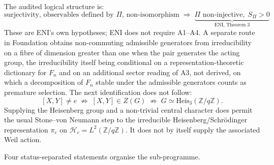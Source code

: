 \documentclass[11pt,a4paper]{article}
\theoremstyle{definition}
\newcommand{\Heis}{\mathrm{Heis}}
\newcommand{\SPI}{S_\Pi}
\newcommand{\Hc}{\mathcal{H}_c}
\newcommand{\pic}{\pi_c}
\begin{document}
    The audited logical structure is:
    \[
      \text{surjectivity, observables defined by }\Pi\text{, non-isomorphism}
      \;\Longrightarrow\;
      \underbrace{\Pi \text{ non-injective},\; \SPI > 0}_{\text{ENI, Theorem~3}}
    \]
    These are ENI's own hypotheses; ENI does not require A1--A4.  A separate route in Foundation
    obtains non-commuting admissible generators from irreducibility on a fibre of dimension greater
    than one when the pair generates the acting group, the irreducibility itself being conditional
    on a representation-theoretic dictionary for $F_n$ and on an additional sector reading of A3, not
    derived, on which a decomposition of $F_n$ stable under the admissible generators counts as premature
    selection.
    The next identification does not follow:
    \[
      [X,Y]\neq e
      \;\not\Longrightarrow\;
      [X,Y]\in Z(G)
      \;\not\Longrightarrow\;
      G\simeq\Heis_3(\mathbb{Z}/q\mathbb{Z}).
    \]
    Supplying the Heisenberg group and a non-trivial central character does permit the usual
    Stone--von Neumann step to the irreducible Heisenberg/Schr\"odinger representation $\pic$ on
    $\Hc=L^2(\mathbb{Z}/q\mathbb{Z})$. It does not by itself supply the associated Weil action.

    Four status-separated statements organise the sub-programme.
\end{document}
